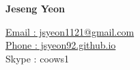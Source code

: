 \documentclass[letterpaper,11pt,oneside]{article}
\begin{document}
\begin{center}
\noindent  \LARGE{\textbf{Jeseng Yeon}}
\end{center}

\normalsize



\vspace{-3ex}
\null\hfill \href{mailto:jsyeon1121@gmail.com}{Email : jsyeon1121@gmail.com} \\
\null\hfill  \href{jsyeon92.github.io}{Phone : jsyeon92.github.io}   \\
\null\hfill Skype : coows1 \\
\vspace{-2ex}


\vspace{1em}

\end{document}
